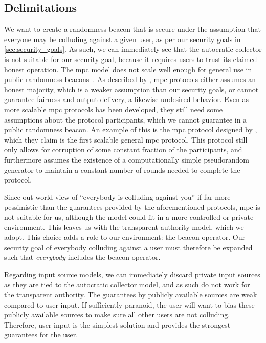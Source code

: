 \subsection{Delimitations}%
\label{sub:delimitations}
We want to create a randomness beacon that is secure under the assumption that everyone may be colluding against a given user, as per our security goals in \cref{sec:security_goals}.
As such, we can immediately see that the autocratic collector is not suitable for our security goal, because it requires users to trust its claimed honest operation.
The \gls{mpc} model does not scale well enough for general use in public randomness beacons~\cite{syta2017scalable}.
As described by \citet{damgaard2006scalable}, \gls{mpc} protocols either assumes an honest majority, which is a weaker assumption than our security goals, or cannot guarantee fairness and output delivery, a likewise undesired behavior.
Even as more scalable \gls{mpc} protocols has been developed, they still need some assumptions about the protocol participants, which we cannot guarantee in a public randomness beacon.
An example of this is the \gls{mpc} protocol designed by \citet{damgaard2006scalable}, which they claim is the first scalable general \gls{mpc} protocol.
This protocol still only allows for corruption of some constant fraction of the participants, and furthermore assumes the existence of a computationally simple pseudorandom generator to maintain a constant number of rounds needed to complete the protocol.

Since out world view of \enquote{everybody is colluding against you} if far more pessimistic than the guarantees provided by the aforementioned protocols, \gls{mpc} is not suitable for us, although the model could fit in a more controlled or private environment.
This leaves us with the transparent authority model, which we adopt.
This choice adds a role to our environment: the beacon operator. Our security goal of everybody colluding against a user must therefore be expanded such that \emph{everybody} includes the beacon operator.

Regarding input source models, we can immediately discard private input sources as they are tied to the autocratic collector model, and as such do not work for the transparent authority.
The guarantees by publicly available sources are weak compared to user input.
If sufficiently paranoid, the user will want to bias these publicly available sources to make sure all other users are not colluding.
Therefore, user input is the simplest solution and provides the strongest guarantees for the user.
